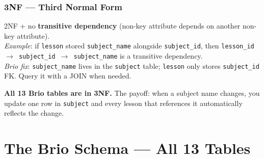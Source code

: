 \documentclass[11pt,a4paper]{article}
\newcommand{\T}[1]{\texttt{#1}}          %
\begin{document}
\subsubsection{3NF — Third Normal Form}
\begin{defbox}
2NF + no \textbf{transitive dependency} (non-key attribute depends on another non-key
attribute).\\[4pt]
\textit{Example}: if \T{lesson} stored \T{subject\_name} alongside \T{subject\_id},
then \T{lesson\_id $\to$ subject\_id $\to$ subject\_name} is a transitive dependency.\\
\textit{Brio fix}: \T{subject\_name} lives in the \T{subject} table; \T{lesson} only
stores \T{subject\_id} FK. Query it with a JOIN when needed.
\end{defbox}

\begin{keybox}
\textbf{All 13 Brio tables are in 3NF.} The payoff: when a subject name changes, you
update one row in \T{subject} and every lesson that references it automatically reflects
the change.
\end{keybox}

\section{The Brio Schema --- All 13 Tables}
\end{document}
